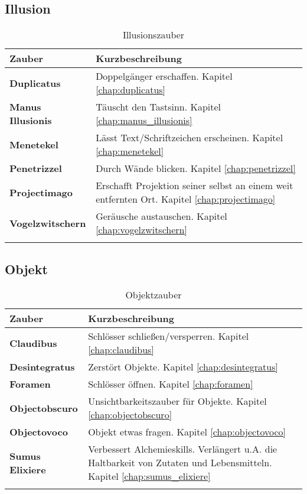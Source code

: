 \subsection{Illusion}
\begin{longtable}{|p{5cm}|p{10cm}|}
\hline
\textbf{Zauber} & \textbf{Kurzbeschreibung} \\ \hline

\textbf{Duplicatus} & Doppelgänger erschaffen. Kapitel \ref{chap:duplicatus} \\ \hline

\textbf{Manus Illusionis} & Täuscht den Tastsinn. Kapitel \ref{chap:manus_illusionis} \\ \hline

\textbf{Menetekel} & Lässt Text/Schriftzeichen erscheinen. Kapitel \ref{chap:menetekel} \\ \hline

\textbf{Penetrizzel} & Durch Wände blicken. Kapitel \ref{chap:penetrizzel} \\ \hline

\textbf{Projectimago} & Erschafft Projektion seiner selbst an einem weit entfernten Ort. Kapitel \ref{chap:projectimago} \\ \hline

\textbf{Vogelzwitschern} & Geräusche austauschen. Kapitel \ref{chap:vogelzwitschern} \\ \hline

\caption{Illusionszauber}
\label{tab:illusionszauber}
\end{longtable}


\subsection{Objekt}
\begin{longtable}{|p{5cm}|p{10cm}|}
\hline
\textbf{Zauber} & \textbf{Kurzbeschreibung} \\ \hline

\textbf{Claudibus} & Schlösser schließen/versperren. Kapitel \ref{chap:claudibus} \\ \hline

\textbf{Desintegratus} & Zerstört Objekte. Kapitel \ref{chap:desintegratus} \\ \hline

\textbf{Foramen} & Schlösser öffnen. Kapitel \ref{chap:foramen} \\ \hline

\textbf{Objectobscuro} & Unsichtbarkeitszauber für Objekte. Kapitel \ref{chap:objectobscuro} \\ \hline

\textbf{Objectovoco} & Objekt etwas fragen. Kapitel \ref{chap:objectovoco} \\ \hline

\textbf{Sumus Elixiere} & Verbessert Alchemieskills. Verlängert u.A. die Haltbarkeit von Zutaten und Lebensmitteln. Kapitel \ref{chap:sumus_elixiere} \\ \hline

\caption{Objektzauber}
\label{tab:objektzauber}
\end{longtable}


